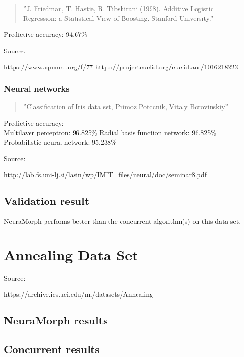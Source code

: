 \documentclass[8pt, a4paper]{article}
\begin{document}
\begin{quote}
''J. Friedman, T. Hastie, R. Tibshirani (1998). Additive Logistic Regression: a Statistical View of Boosting. Stanford University.''
\end{quote}

Predictive accuracy: 94.67\%

Source:

https://www.openml.org/f/77
https://projecteuclid.org/euclid.aos/1016218223

\subsubsection{Neural networks}

\begin{quote}
''Classification of Iris data set, Primoz Potocnik, Vitaly Borovinskiy''
\end{quote}

Predictive accuracy:\\
Multilayer perceptron: 96.825\%
Radial basis function network: 96.825\%
Probabilistic neural network: 95.238\%

Source:

http://lab.fs.uni-lj.si/lasin/wp/IMIT_files/neural/doc/seminar8.pdf

\subsection{Validation result}

NeuraMorph performs better than the concurrent algorithm(s) on this data set.




\section{Annealing Data Set}

Source: 

https://archive.ics.uci.edu/ml/datasets/Annealing

\subsection{NeuraMorph results}

%

\subsection{Concurrent results}
\end{document}
